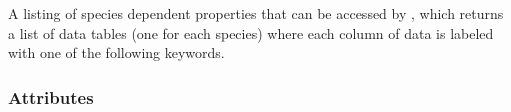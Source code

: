 \documentclass[letterpaper,10pt,english,openany,oneside]{sphinxmanual}
\begin{document}
\begin{fulllineitems}
\label{\detokenize{api/pytb.parameters.ParticleParameters:pytb.parameters.ParticleParameters}}
\pysigstartsignatures
{}
\pysigstopsignatures
\sphinxAtStartPar
A listing of species dependent properties that can be accessed by
{\hyperref[\detokenize{api/pytb.ThunderBoltz.get_particle_tables:pytb.ThunderBoltz.get_particle_tables}]{}}, which returns a list of data tables
(one for each species) where each column of data is labeled with one of the
following keywords.
\subsubsection*{Attributes}



\end{fulllineitems}
\end{document}

